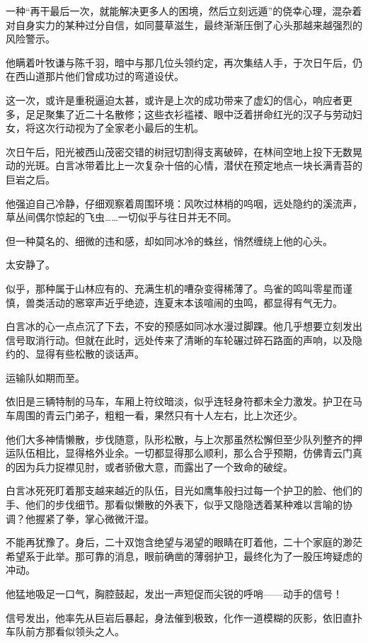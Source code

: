 一种“再干最后一次，就能解决更多人的困境，然后立刻远遁”的侥幸心理，混杂着对自身实力的某种过分自信，如同蔓草滋生，最终渐渐压倒了心头那越来越强烈的风险警示。

他瞒着叶牧谦与陈千羽，暗中与那几位头领约定，再次集结人手，于次日午后，仍在西山道那片他们曾成功过的弯道设伏。

这一次，或许是重税逼迫太甚，或许是上次的成功带来了虚幻的信心，响应者更多，足足聚集了近二十名散修；这些衣衫褴褛、眼中泛着拼命红光的汉子与劳动妇女，将这次行动视为了全家老小最后的生机。

次日午后，阳光被西山茂密交错的树冠切割得支离破碎，在林间空地上投下无数晃动的光斑。白言冰带着比上一次复杂十倍的心情，潜伏在预定地点一块长满青苔的巨岩之后。

他强迫自己冷静，仔细观察着周围环境：风吹过林梢的呜咽，远处隐约的溪流声，草丛间偶尔惊起的飞虫……一切似乎与往日并无不同。

但一种莫名的、细微的违和感，却如同冰冷的蛛丝，悄然缠绕上他的心头。

太安静了。

似乎，那种属于山林应有的、充满生机的嘈杂变得稀薄了。鸟雀的鸣叫零星而谨慎，兽类活动的窸窣声近乎绝迹，连夏末本该喧闹的虫鸣，都显得有气无力。

白言冰的心一点点沉了下去，不安的预感如同冰水漫过脚踝。他几乎想要立刻发出信号取消行动。但就在此时，远处传来了清晰的车轮碾过碎石路面的声响，以及隐约的、显得有些松散的谈话声。

运输队如期而至。

依旧是三辆特制的马车，车厢上符纹暗淡，似乎连轻身符都未全力激发。护卫在马车周围的青云门弟子，粗粗一看，果然只有十人左右，比上次还少。

他们大多神情懒散，步伐随意，队形松散，与上次那虽然松懈但至少队列整齐的押运队伍相比，显得格外业余。一切都显得那么顺利，那么合乎预期，仿佛青云门真的因为兵力捉襟见肘，或者骄傲大意，而露出了一个致命的破绽。

白言冰死死盯着那支越来越近的队伍，目光如鹰隼般扫过每一个护卫的脸、他们的手、他们的步伐细节。那看似懒散的外表下，似乎又隐隐透着某种难以言喻的协调？他握紧了拳，掌心微微汗湿。

不能再犹豫了。身后，二十双饱含绝望与渴望的眼睛在盯着他，二十个家庭的渺茫希望系于此举。那可靠的消息，眼前确凿的薄弱护卫，最终化为了一股压垮疑虑的冲动。

他猛地吸足一口气，胸腔鼓起，发出一声短促而尖锐的呼哨——动手的信号！

信号发出，他率先从巨岩后暴起，身法催到极致，化作一道模糊的灰影，依旧直扑车队前方那看似领头之人。

